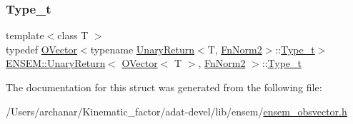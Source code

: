 \mbox{\label{structENSEM_1_1UnaryReturn_3_01OVector_3_01T_01_4_00_01FnNorm2_01_4_a67bb1e2e118524484dc34c80b8d75046}} 
\subsubsection{\texorpdfstring{Type\_t}{Type\_t}\hspace{0.1cm}{\footnotesize\ttfamily [3/3]}}
{\footnotesize\ttfamily template$<$class T $>$ \\
typedef \mbox{\hyperlink{classENSEM_1_1OVector}{O\+Vector}}$<$typename \mbox{\hyperlink{structENSEM_1_1UnaryReturn}{Unary\+Return}}$<$T, \mbox{\hyperlink{structENSEM_1_1FnNorm2}{Fn\+Norm2}}$>$\+::\mbox{\hyperlink{structENSEM_1_1UnaryReturn_3_01OVector_3_01T_01_4_00_01FnNorm2_01_4_a67bb1e2e118524484dc34c80b8d75046}{Type\+\_\+t}}$>$ \mbox{\hyperlink{structENSEM_1_1UnaryReturn}{E\+N\+S\+E\+M\+::\+Unary\+Return}}$<$ \mbox{\hyperlink{classENSEM_1_1OVector}{O\+Vector}}$<$ T $>$, \mbox{\hyperlink{structENSEM_1_1FnNorm2}{Fn\+Norm2}} $>$\+::\mbox{\hyperlink{structENSEM_1_1UnaryReturn_3_01OVector_3_01T_01_4_00_01FnNorm2_01_4_a67bb1e2e118524484dc34c80b8d75046}{Type\+\_\+t}}}



The documentation for this struct was generated from the following file\+:\begin{DoxyCompactItemize}
\item 
/\+Users/archanar/\+Kinematic\+\_\+factor/adat-\/devel/lib/ensem/\mbox{\hyperlink{adat-devel_2lib_2ensem_2ensem__obsvector_8h}{ensem\+\_\+obsvector.\+h}}\end{DoxyCompactItemize}
